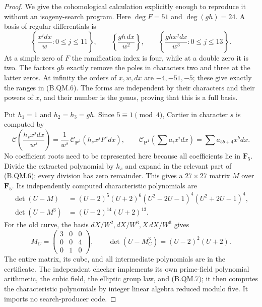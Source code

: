 \begin{proof}
We give the cohomological calculation explicitly enough to
reproduce it without an isogeny-search program. Here $\deg F=51$
and $\deg(gh)=24$. A basis of regular differentials is
\[
 \left\{\frac{x^jdx}{w}:0\le j\le11\right\},\qquad
 \left\{\frac{gh\,dx}{w^2}\right\},\qquad
 \left\{\frac{ghx^jdx}{w^3}:0\le j\le13\right\}.                \tag{B.QM.6}
\]
At a simple zero of $F$ the ramification index is four, while
at a double zero it is two. The factors $gh$ exactly remove
the poles in characters two and three at the latter zeros.
At infinity the orders of $x,w,dx$ are $-4,-51,-5$;
these give exactly the ranges in (B.QM.6). The forms are
independent by their characters and their powers of $x$, and
their number is the genus, proving that this is a full basis.

Put $h_1=1$ and $h_2=h_3=gh$. Since $5\equiv1\pmod4$,
Cartier in character $s$ is computed by
\[
 \mathcal C\!\left(\frac{h_s x^jdx}{w^s}\right)
   =\frac1{w^s}\,
      \mathcal C_{\mathbf P^1}(h_sx^jF^s dx),\qquad
 \mathcal C_{\mathbf P^1}\!\left(\sum a_i x^i dx\right)
        =\sum a_{5b+4}x^b dx.                                  \tag{B.QM.7}
\]
No coefficient roots need to be represented here because
all coefficients lie in $\mathbf F_5$. Divide the extracted
polynomial by $h_s$ and expand in the relevant part of
(B.QM.6); every division has zero remainder. This gives a
$27\times27$ matrix $M$ over $\mathbf F_5$. Its independently
computed characteristic polynomials are
\[
\begin{split}
 \det(U-M)
   &=(U-2)^5(U+2)^6
       (U^2-2U-1)^4(U^2+2U-1)^4,\\
 \det(U-M^3)&=(U-2)^{14}(U+2)^{13}.
\end{split}                                                    \tag{B.QM.8}
\]
For the old curve, the basis $dX/W^2,dX/W^3,X\,dX/W^3$ gives
\[
 M_C=\begin{pmatrix}3&0&0\\0&0&4\\0&1&0\end{pmatrix},\qquad
                \det(U-M_C^3)=(U-2)^2(U+2).                    \tag{B.QM.9}
\]
The entire matrix, its cube, and all intermediate polynomials
are in the certificate. The independent checker
 implements its own
prime-field polynomial arithmetic, the cubic field, the
elliptic group law, and (B.QM.7); it then computes the
characteristic polynomials by integer linear algebra reduced
modulo five. It imports no search-producer code.


\end{proof}
